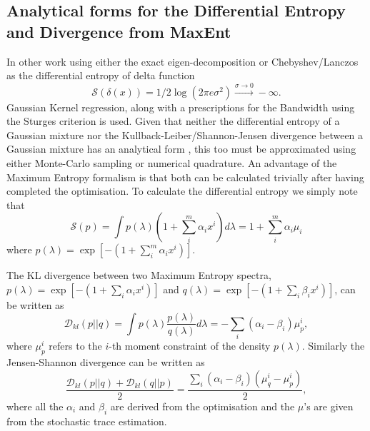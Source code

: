 \documentclass{article}
\begin{document}
\subsection{Analytical forms for the Differential Entropy and Divergence from MaxEnt}
In other work using either the exact eigen-decomposition \citep{takahashi2012discriminating} or Chebyshev/Lanczos \citep{ubaruapplications} as the differential entropy of delta function
\begin{equation}
\mathcal{S}(\delta(x)) = 1/2 \log(2\pi e\sigma^{2}) \xrightarrow{\sigma\rightarrow 0} -\infty .
\end{equation}
Gaussian Kernel regression, along with a prescriptions for the Bandwidth using the Sturges criterion is used. Given that neither the differential entropy of a Gaussian mixture nor the Kullback-Leiber/Shannon-Jensen divergence between a Gaussian mixture has an analytical form \citep{hershey2007approximating}, this too must be approximated using either Monte-Carlo sampling or numerical quadrature. An advantage of the Maximum Entropy formalism is that both can be calculated trivially after having completed the optimisation.
To calculate the differential entropy we simply note that
\begin{equation}
\mathcal{S}(p) = \int p(\lambda) (1+\sum_{i}^{m}\alpha_{i}x^{i}) d\lambda= 1+\sum_{i}^{m}\alpha_{i}\mu_{i}
\end{equation}
where $p(\lambda) = \exp[-(1+\sum_{i}^{m}\alpha_{i}x^{i})]$.


The KL divergence between two Maximum Entropy spectra, $p(\lambda) = \exp[-(1+\sum_{i}\alpha_{i}x^{i})]$ and $q(\lambda) = \exp[-(1+\sum_{i}\beta_{i}x^{i})]$, can be written as
\begin{equation}
\mathcal{D}_{kl}(p||q) = \int p(\lambda)\frac{p(\lambda)}{q(\lambda)}d\lambda = -\sum_{i}(\alpha_{i}-\beta_{i})\mu_{p}^{i},
\end{equation}
where $\mu_{p}^{i}$ refers to the $i$-th moment constraint of the density $p(\lambda)$. Similarly the Jensen-Shannon divergence can be written as 
\begin{equation}
\frac{\mathcal{D}_{kl}(p||q)+\mathcal{D}_{kl}(q||p)}{2} = \frac{\sum_{i}(\alpha_{i}-\beta_{i})(\mu_{q}^{i}-\mu_{p}^{i})}{2},
\end{equation}
where all the $\alpha_{i}$ and $\beta_{i}$ are derived from the optimisation and the $\mu$'s are given from the stochastic trace estimation.

\end{document}
